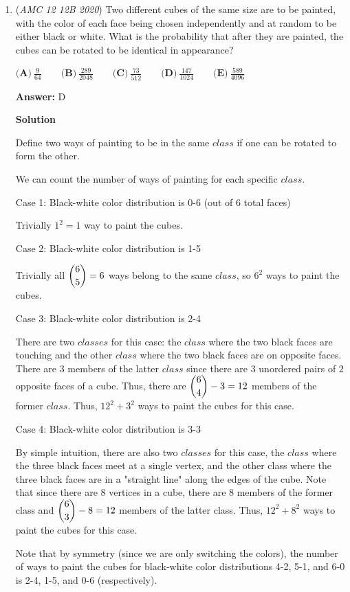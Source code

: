 \begin{enumerate}
	\item (\textit{AMC 12 12B 2020}) Two different cubes of the same size are to be painted, with the color of each face being chosen independently and at random to be either black or white. What is the probability that after they are painted, the cubes can be rotated to be identical in appearance?


 $\textbf{(A)}\ \frac{9}{64} \qquad\textbf{(B)}\ \frac{289}{2048} \qquad\textbf{(C)}\  \frac{73}{512} \qquad\textbf{(D)}\ \frac{147}{1024} \qquad\textbf{(E)}\ \frac{589}{4096}$

 \textbf{Answer: }D



\textbf{Solution}

Define two ways of painting to be in the same $class$ if one can be rotated to form the other.

 We can count the number of ways of painting for each specific $class$.

 Case 1: Black-white color distribution is 0-6 (out of 6 total faces)

 Trivially $1^2 = 1$ way to paint the cubes.

 Case 2: Black-white color distribution is 1-5

 Trivially all $\dbinom{6}{5} = 6$ ways belong to the same $class$, so $6^2$ ways to paint the cubes.

 Case 3: Black-white color distribution is 2-4

 There are two $classes$ for this case: the $class$ where the two black faces are touching and the other $class$ where the two black faces are on opposite faces. There are $3$ members of the latter $class$ since there are $3$ unordered pairs of $2$ opposite faces of a cube. Thus, there are $\dbinom{6}{4} - 3 = 12$ members of the former $class$. Thus, $12^2 + 3^2$ ways to paint the cubes for this case.

 Case 4: Black-white color distribution is 3-3

 By simple intuition, there are also two $classes$ for this case, the $class$ where the three black faces meet at a single vertex, and the other class where the three black faces are in a "straight line" along the edges of the cube. Note that since there are $8$ vertices in a cube, there are $8$ members of the former class and $\dbinom{6}{3} - 8 = 12$ members of the latter class. Thus, $12^2 + 8^2$ ways to paint the cubes for this case.

 Note that by symmetry (since we are only switching the colors), the number of ways to paint the cubes for black-white color distributions 4-2, 5-1, and 6-0 is 2-4, 1-5, and 0-6 (respectively).


\end{enumerate}
